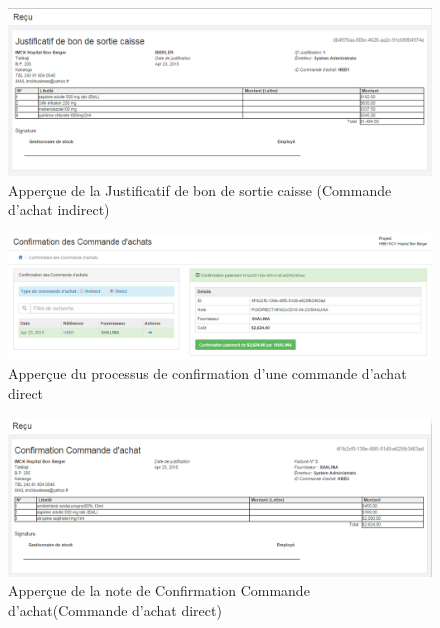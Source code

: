 \documentclass[12pt,a4paper]{report}
\begin{document}
\begin{figure}[h]
\begin{center}
\includegraphics[width=12cm]{pic/JustSonCaisse.png}
\end{center}
\caption{Apperçue de la Justificatif de bon de sortie caisse (Commande d'achat indirect)}
\label{Apperçue de la Justificatif de bon de sortie caisse  (Commande d'achat indirect)}
\end{figure} 

\newpage

\begin{figure}[h]
\begin{center}
\includegraphics[width=12cm]{pic/ConfPOAchatDirect.png}
\end{center}
\caption{Apperçue du processus de confirmation d'une commande d'achat direct}
\label{Apperçue du processus de confirmation d'une commande d'achat direct}
\end{figure} 


\begin{figure}[h]
\begin{center}
\includegraphics[width=12cm]{pic/ConfComAchat.png}
\end{center}
\caption{Apperçue de la note de Confirmation Commande d'achat(Commande d'achat direct)}
\label{Apperçue de la note de Confirmation Commande d'achat(Commande d'achat direct)}
\end{figure} 
\end{document}
